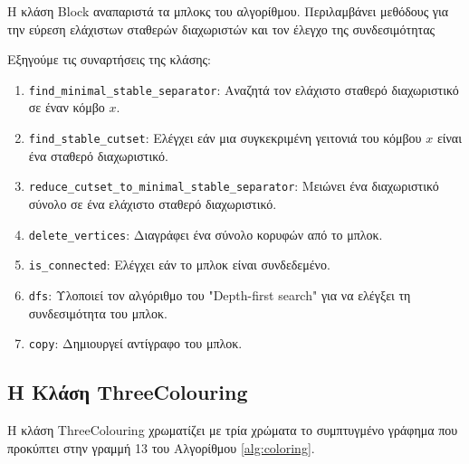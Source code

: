 Η κλάση Block αναπαριστά τα μπλοκς του αλγορίθμου. Περιλαμβάνει μεθόδους για την εύρεση ελάχιστων σταθερών διαχωριστών και τον έλεγχο της συνδεσιμότητας




Εξηγούμε τις συναρτήσεις της κλάσης:

\begin{enumerate}
	\item \texttt{find\_minimal\_stable\_separator}: Αναζητά τον ελάχιστο σταθερό διαχωριστικό σε έναν κόμβο $x$.
	
	\item \texttt{find\_stable\_cutset}: Ελέγχει εάν μια συγκεκριμένη γειτονιά του κόμβου $x$ είναι ένα σταθερό διαχωριστικό.
	
	\item \texttt{reduce\_cutset\_to\_minimal\_stable\_separator}: Μειώνει ένα διαχωριστικό σύνολο σε ένα ελάχιστο σταθερό διαχωριστικό.
	
	\item \texttt{delete\_vertices}: Διαγράφει ένα σύνολο κορυφών από το μπλοκ.
	
	\item \texttt{is\_connected}: Ελέγχει εάν το μπλοκ είναι συνδεδεμένο.
	
	\item \texttt{dfs}: Υλοποιεί τον αλγόριθμο του "Depth-first search" για να ελέγξει τη συνδεσιμότητα του μπλοκ.
	
	\item \texttt{copy}: Δημιουργεί αντίγραφο του μπλοκ.
\end{enumerate}

\subsection{H Kλάση ThreeColouring}

Η κλάση ThreeColouring χρωματίζει με τρία χρώματα το συμπτυγμένο γράφημα που προκύπτει στην γραμμή 13 του Αλγορίθμου \ref{alg:coloring}.






